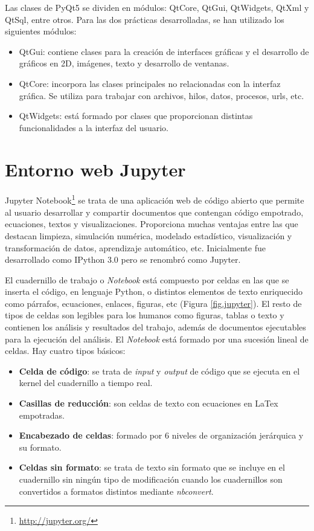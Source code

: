 Las clases de PyQt5 se dividen en módulos: QtCore, QtGui, QtWidgets, QtXml y QtSql, entre otros. Para las dos prácticas desarrolladas, se han utilizado los siguientes módulos:
\begin{itemize}
	\item QtGui: contiene clases para la creación de interfaces gráficas y el desarrollo de gráficos en 2D, imágenes, texto y desarrollo de ventanas.
	\item QtCore: incorpora las clases principales no relacionadas con la interfaz gráfica. Se utiliza para trabajar con archivos, hilos, datos, procesos, urls, etc.
	\item QtWidgets: está formado por clases que proporcionan distintas funcionalidades a la interfaz del usuario.
\end{itemize}

\section{Entorno web Jupyter} \label{cap.Jupyter}
Jupyter Notebook\footnote{\url{http://jupyter.org/}} se trata de una aplicación web de código abierto que permite al usuario desarrollar y compartir documentos que contengan código empotrado, ecuaciones, textos y visualizaciones. Proporciona muchas ventajas entre las que destacan limpieza, simulación numérica, modelado estadístico, visualización y transformación de datos, aprendizaje automático, etc. Inicialmente fue desarrollado como IPython 3.0 pero se renombró como Jupyter.

El cuadernillo de trabajo o \textit{Notebook} está compuesto por celdas en las que se inserta el código, en lenguaje Python, o distintos elementos de texto enriquecido como párrafos, ecuaciones, enlaces, figuras, etc (Figura \ref{fig.jupyter}). El resto de tipos de celdas son legibles para los humanos como figuras, tablas o texto y contienen los análisis y resultados del trabajo, además de documentos ejecutables para la ejecución del análisis.
El \textit{Notebook} está formado por una sucesión lineal de celdas. Hay cuatro tipos básicos:

\begin{itemize}
	\item \textbf{Celda de código}: se trata de \textit{input} y \textit{output} de código que se ejecuta en el kernel del cuadernillo a tiempo real.
	\item \textbf{Casillas de reducción}: son celdas de texto con ecuaciones en LaTex empotradas.
	\item \textbf{Encabezado de celdas}: formado por 6 niveles de organización jerárquica y su formato.
	\item \textbf{Celdas sin formato}: se trata de texto sin formato que se incluye en el cuadernillo sin ningún tipo de modificación cuando los cuadernillos son convertidos a formatos distintos mediante \textit{nbconvert}.
\end{itemize}

